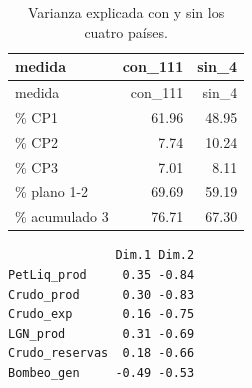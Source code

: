 \documentclass[oneside, openany, fontset=libertinus]{mitthesis}
\newenvironment{Shaded}{\begin{snugshade}}{\end{snugshade}}
\newcommand{\AttributeTok}[1]{\textcolor[rgb]{0.40,0.45,0.13}{#1}}
\newcommand{\ConstantTok}[1]{\textcolor[rgb]{0.56,0.35,0.01}{#1}}
\newcommand{\DecValTok}[1]{\textcolor[rgb]{0.68,0.00,0.00}{#1}}
\newcommand{\FunctionTok}[1]{\textcolor[rgb]{0.28,0.35,0.67}{#1}}
\newcommand{\NormalTok}[1]{\textcolor[rgb]{0.00,0.23,0.31}{#1}}
\newcommand{\OtherTok}[1]{\textcolor[rgb]{0.00,0.23,0.31}{#1}}
\newcommand{\SpecialCharTok}[1]{\textcolor[rgb]{0.37,0.37,0.37}{#1}}
\begin{document}
\Needspace{2.12in}

\begin{longtable}[]{@{}lrr@{}}
\caption{Varianza explicada con y sin los cuatro países.}\tabularnewline
\toprule\noalign{}
medida & con\_111 & sin\_4 \\
\midrule\noalign{}
\endfirsthead
\toprule\noalign{}
medida & con\_111 & sin\_4 \\
\midrule\noalign{}
\endhead
\bottomrule\noalign{}
\endlastfoot
\% CP1 & 61.96 & 48.95 \\
\% CP2 & 7.74 & 10.24 \\
\% CP3 & 7.01 & 8.11 \\
\% plano 1-2 & 69.69 & 59.19 \\
\% acumulado 3 & 76.71 & 67.30 \\
\end{longtable}

\Needspace{1.90in}

\begin{Shaded}
\end{Shaded}

\begin{verbatim}
               Dim.1 Dim.2
PetLiq_prod     0.35 -0.84
Crudo_prod      0.30 -0.83
Crudo_exp       0.16 -0.75
LGN_prod        0.31 -0.69
Crudo_reservas  0.18 -0.66
Bombeo_gen     -0.49 -0.53
\end{verbatim}

\Needspace{0.76in}

\begin{Shaded}
\end{Shaded}
\end{document}

